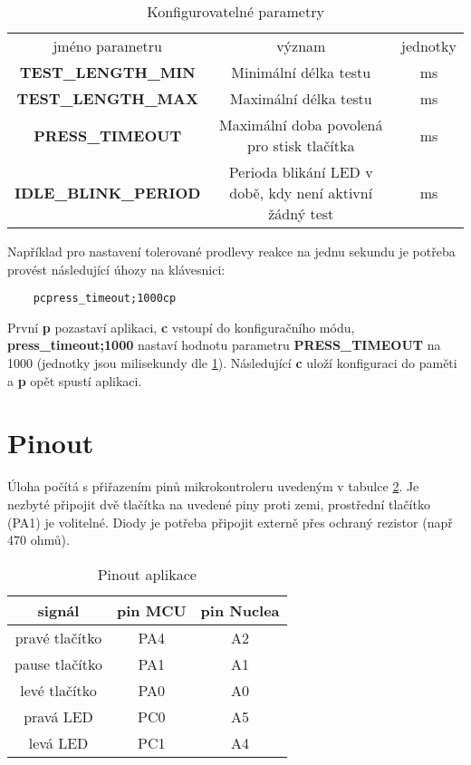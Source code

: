 \documentclass[twoside]{article}
\begin{document}
\begin{table}[htbp]
    \centering
    \begin{tabular}{c|c|c}
        jméno parametru & význam & jednotky \\
        \textbf{TEST\_LENGTH\_MIN} & Minimální délka testu & ms\\
        \textbf{TEST\_LENGTH\_MAX} & Maximální délka testu & ms\\
        \textbf{PRESS\_TIMEOUT} & Maximální doba povolená pro stisk tlačítka & ms \\
        \textbf{IDLE\_BLINK\_PERIOD} & Perioda blikání LED v době, kdy není aktivní žádný test & ms
    \end{tabular}
    \caption{Konfigurovatelné parametry}
    \label{table:config}
\end{table}

Například pro nastavení tolerované prodlevy reakce na jednu sekundu je potřeba provést následující úhozy na klávesnici:
\begin{lstlisting}
    pcpress_timeout;1000cp
\end{lstlisting}
První \textbf{p} pozastaví aplikaci, \textbf{c} vstoupí do konfiguračního módu, \textbf{press\_timeout;1000} nastaví hodnotu parametru \textbf{PRESS\_TIMEOUT}
na 1000 (jednotky jsou milisekundy dle \ref{table:config}). Následující \textbf{c} uloží konfiguraci do paměti a \textbf{p} opět spustí aplikaci.

\section{Pinout}

Úloha počítá s přiřazením pinů mikrokontroleru uvedeným v tabulce \ref{table:pinout}. Je nezbyté připojit dvě tlačítka na uvedené piny proti zemi,
prostřední tlačítko (PA1) je volitelné.
Diody je potřeba připojit externě přes ochraný rezistor (např 470 ohmů).

\begin{table}[htbp]
    \centering
    \begin{tabular}{c|c|c}
        signál & pin MCU & pin Nuclea \\ \hline
        pravé tlačítko & PA4 & A2 \\
        pause tlačítko & PA1 & A1 \\
        levé tlačítko & PA0 & A0 \\
        pravá LED & PC0 & A5 \\
        levá LED & PC1 & A4
    \end{tabular}
    \caption{Pinout aplikace}
    \label{table:pinout}
\end{table}
\end{document}
